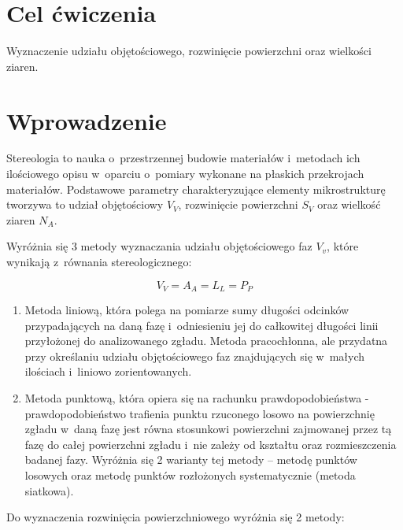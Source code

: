 \documentclass[a4paper,12pt]{article}
\begin{document}
    



\section{Cel ćwiczenia}

Wyznaczenie udziału objętościowego, rozwinięcie powierzchni oraz wielkości ziaren.

\section{Wprowadzenie}

Stereologia to nauka o~przestrzennej budowie materiałów i~metodach ich ilościowego opisu w~oparciu o~pomiary wykonane na płaskich przekrojach materiałów. Podstawowe parametry charakteryzujące elementy mikrostrukturę tworzywa to udział objętościowy $V_V$, rozwinięcie powierzchni $S_V$ oraz wielkość ziaren $N_A$.

Wyróżnia się {\color{purple}3} metody wyznaczania udziału objętościowego faz $V_v$, które wynikają z~równania stereologicznego:

$$V_V=A_A=L_L=P_P$$

\begin{enumerate}
    \item Metoda liniową, która polega na pomiarze sumy długości  odcinków przypadających na daną fazę i~odniesieniu jej do całkowitej długości linii przyłożonej do analizowanego zgładu. Metoda pracochłonna, ale przydatna przy określaniu udziału objętościowego faz znajdujących się w~małych ilościach i~liniowo zorientowanych. 
    \item Metoda punktową, która opiera się na rachunku prawdopodobieństwa - prawdopodobieństwo trafienia punktu rzuconego losowo na powierzchnię zgładu w~daną fazę jest równa stosunkowi powierzchni zajmowanej przez tą fazę do całej powierzchni zgładu i~nie zależy od kształtu oraz rozmieszczenia badanej fazy. Wyróżnia się 2 warianty tej metody – metodę punktów losowych oraz metodę punktów rozłożonych systematycznie (metoda siatkowa).
\end{enumerate}

\newpage

Do wyznaczenia rozwinięcia powierzchniowego wyróżnia się 2 metody:
\end{document}
